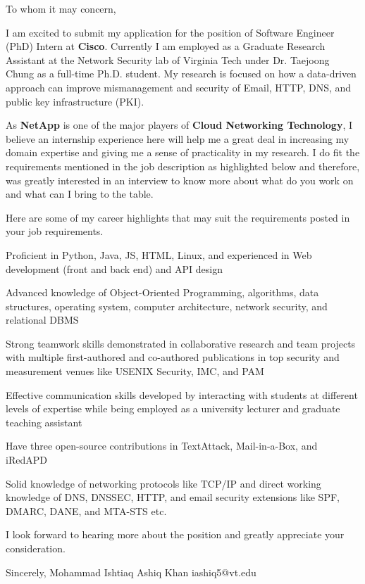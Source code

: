 To whom it may concern,

I am excited to submit my application for the position of Software Engineer (PhD) Intern at \textbf{Cisco}. Currently I am employed as a Graduate Research Assistant at the Network Security lab of Virginia Tech under Dr. Taejoong Chung as a full-time Ph.D. student. My research is focused on how a data-driven approach can improve mismanagement and security of Email, HTTP, DNS, and public key infrastructure (PKI).


As \textbf{NetApp} is one of the major players of \textbf{Cloud Networking Technology}, I believe an internship experience here will help me a great deal in increasing my domain expertise and giving me a sense of practicality in my research. I do fit the requirements mentioned in the job description as highlighted below and therefore, was greatly interested in an interview to know more about what do you work on and what can I bring to the table.

Here are some of my career highlights that may suit the requirements posted in your job requirements.

Proficient in Python, Java, JS, HTML, Linux, and experienced in Web development (front and back end) and API design

Advanced knowledge of Object-Oriented Programming, algorithms, data structures, operating system, computer architecture, network security, and relational DBMS

Strong teamwork skills demonstrated in collaborative research and team projects with multiple first-authored and co-authored publications in top security and measurement venues like USENIX Security, IMC, and PAM

Effective communication skills developed by interacting with students at different levels of expertise while being employed as a university lecturer and graduate teaching assistant

Have three open-source contributions in TextAttack, Mail-in-a-Box, and iRedAPD

Solid knowledge of networking protocols like TCP/IP and direct working knowledge of DNS, DNSSEC, HTTP, and email security extensions like SPF, DMARC, DANE, and MTA-STS etc.

I look forward to hearing more about the position and greatly appreciate your consideration.

Sincerely,
Mohammad Ishtiaq Ashiq Khan
iashiq5@vt.edu